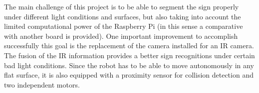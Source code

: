 The main challenge of this project is to be able to segment the sign properly under different light conditions and surfaces, but also taking into account the limited computational power of the Raspberry Pi (in this sense a comparative with another board is provided). One important improvement to accomplish successfully this goal is the replacement of the camera installed for an IR camera. The fusion of the IR information provides a better sign recognitions under certain bad light conditions. Since the robot has to be able to move autonomously in any flat surface, it is also equipped with a proximity sensor for collision detection and two independent motors.